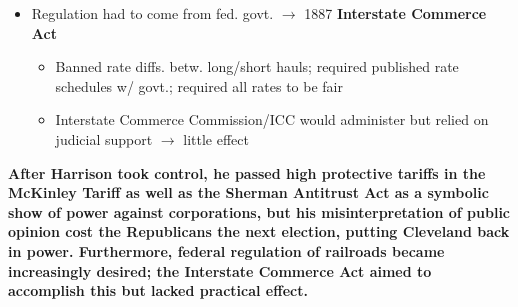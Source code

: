 \documentclass[a4paper]{article}
\begin{document}
{\begin{itemize}
\begin{itemize}
\begin{itemize}
                \end{itemize}
                \item Regulation had to come from fed. govt. $\to$ 1887 \textbf{Interstate Commerce Act} 
                \begin{itemize}
                    \item Banned rate diffs. betw. long/short hauls; required published rate schedules w/ govt.; required all rates to be fair
                    \item Interstate Commerce Commission/ICC would administer but relied on judicial support $\to$ little effect
                \end{itemize}
            \end{itemize}
        \end{itemize}
        \textbf{After Harrison took control, he passed high protective tariffs in the McKinley Tariff as well as the Sherman Antitrust Act as a symbolic show of power against corporations, but his misinterpretation of public opinion cost the Republicans the next election, putting Cleveland back in power. Furthermore, federal regulation of railroads became increasingly desired; the Interstate Commerce Act aimed to accomplish this but lacked practical effect.}}  
\end{document}
